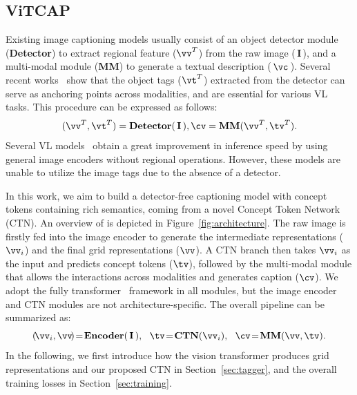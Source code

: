 \subsection{ViTCAP}
Existing image captioning models usually consist of an object detector module (\textbf{Detector}) to extract regional feature ($\vv^{T}$) from the raw image (\,$\mathbf{I}$\,), and a multi-modal module (\textbf{MM}) to generate a textual description (\,$\vc$\,). Several recent works~\citep{li2020oscar,zhang2021multi} show that the object tags ($\vt^{T}$) extracted from the detector can serve as anchoring points across modalities, and are essential for various VL tasks. This procedure can be expressed as follows:
\begin{equation}
    (\vv^{T}, \vt^{T}) = \text{\textbf{Detector}}(\, \mathbf{I}\,), \cv = \text{\textbf{MM}}(\vv^{T}, \tv^{T}).
\end{equation}
Several VL models~\citep{huang2020pixel,kim2021vilt,xu2021e2e} obtain a great improvement in inference speed by using general image encoders without regional operations. However, these models are unable to utilize the image tags due to the absence of a detector.  

In this work, we aim to build a detector-free captioning model with concept tokens containing rich semantics, coming from a novel Concept Token Network (CTN).
An overview of \vitcap is depicted in Figure~\ref{fig:architecture}. 
The raw image is firstly fed into the image encoder to generate the intermediate representations ($\vv_{i}$) and the final grid representations ($\vv$).
A CTN branch then takes $\vv_{i}$ as the input and predicts concept tokens ($\tv$), followed by the multi-modal module that allows the interactions across modalities and generates caption ($\cv$). We adopt the fully transformer~\citep{vaswani2017attention} framework in all modules, but the image encoder and CTN modules are not architecture-specific. The overall pipeline can be summarized as:
\begin{equation}
    (\!\vv_{i}, \vv\!) \!=\! \text{\textbf{Encoder}}(\, \mathbf{I}\,), \ \ \tv \! = \! \text{\textbf{CTN}}(\vv_{i}), \ \ \cv \! = \! \text{\textbf{MM}}(\vv, \tv).
\end{equation}
In the following, we first introduce how the vision transformer produces grid representations and our proposed CTN in Section~\ref{sec:tagger}, and the overall training losses in Section~\ref{sec:training}.


